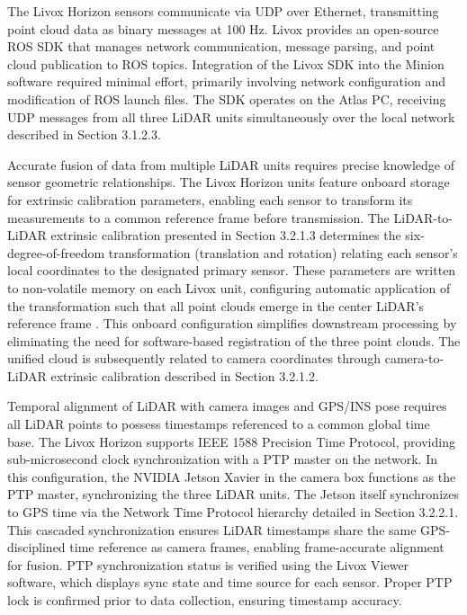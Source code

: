 \documentclass{erauthesis}
\begin{document}
The Livox Horizon sensors communicate via UDP over Ethernet, transmitting point cloud data as binary messages at 100 Hz.
Livox provides an open-source \ac{ROS} SDK that manages network communication, message parsing, and point cloud publication to \ac{ROS} topics.
Integration of the Livox SDK into the Minion software required minimal effort, primarily involving network configuration and modification of \ac{ROS} launch files.
The SDK operates on the Atlas PC, receiving UDP messages from all three \ac{LiDAR} units simultaneously over the local network described in Section 3.1.2.3.

Accurate fusion of data from multiple \ac{LiDAR} units requires precise knowledge of sensor geometric relationships.
The Livox Horizon units feature onboard storage for extrinsic calibration parameters, enabling each sensor to transform its measurements to a common reference frame before transmission.
The \ac{LiDAR}-to-\ac{LiDAR} extrinsic calibration presented in Section 3.2.1.3 determines the six-degree-of-freedom transformation (translation and rotation) relating each sensor's local coordinates to the designated primary sensor.
These parameters are written to non-volatile memory on each Livox unit, configuring automatic application of the transformation such that all point clouds emerge in the center \ac{LiDAR}'s reference frame \cite{thompson2023}.
This onboard configuration simplifies downstream processing by eliminating the need for software-based registration of the three point clouds.
The unified cloud is subsequently related to camera coordinates through camera-to-\ac{LiDAR} extrinsic calibration described in Section 3.2.1.2.

Temporal alignment of \ac{LiDAR} with camera images and \ac{GPS}/\ac{INS} pose requires all \ac{LiDAR} points to possess timestamps referenced to a common global time base.
The Livox Horizon supports IEEE 1588 Precision Time Protocol, providing sub-microsecond clock synchronization with a PTP master on the network.
In this configuration, the NVIDIA Jetson Xavier in the camera box functions as the PTP master, synchronizing the three \ac{LiDAR} units.
The Jetson itself synchronizes to \ac{GPS} time via the Network Time Protocol hierarchy detailed in Section 3.2.2.1.
This cascaded synchronization ensures \ac{LiDAR} timestamps share the same \ac{GPS}-disciplined time reference as camera frames, enabling frame-accurate alignment for fusion.
PTP synchronization status is verified using the Livox Viewer software, which displays sync state and time source for each sensor.
Proper PTP lock is confirmed prior to data collection, ensuring timestamp accuracy.
\end{document}
